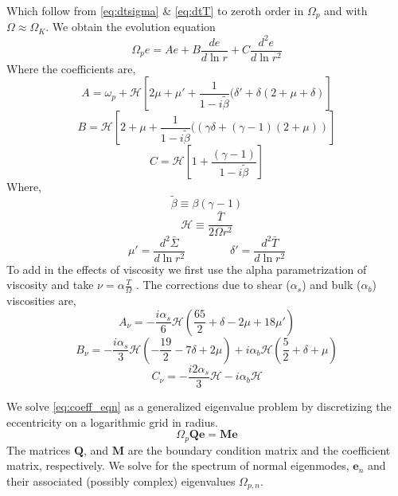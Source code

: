 \documentclass[apj]{emulateapj}
\begin{document}
Which follow from \eqref{eq:dtsigma} \& \eqref{eq:dtT} to zeroth order in $\Omega_p$ and with $\Omega \approx \Omega_K$. We obtain the evolution equation 
\begin{equation} \label{eq:coeff_eqn}
\Omega_p e  = A e + B \frac{d e}{d \ln r} + C  \frac{d^2 e}{ d \ln r^2}
\end{equation}
Where the coefficients are,
\begin{equation}
A = \omega_p  + \mathcal{H} \left[ 2 \mu + \mu'  + \frac{1}{1 - i  \tilde{\beta}} ( \delta' + \delta (2 + \mu + \delta) \right]
\end{equation}
\begin{equation}
B = \mathcal{H} \left[ 2 + \mu + \frac{1}{1 - i \tilde{\beta}} ( \left( \gamma \delta + (\gamma -1 ) (2 + \mu) \right) \right]
\end{equation}
\begin{equation}
C = \mathcal{H} \left[ 1 +  \frac{(\gamma - 1)}{1 - i  \tilde{\beta}} \right]
\end{equation}
Where,
\begin{equation}
\tilde{ \beta} \equiv \beta ( \gamma - 1)
\end{equation}
\begin{equation}
\mathcal{H} \equiv \frac{  \bar{T}}{ 2 \Omega r^2}
\end{equation}
\begin{equation}
\mu ' = \frac{d ^2 \bar{\Sigma}}{d \ln r^2} 
\qquad \qquad
\delta' = \frac{d ^2 \bar{T}}{d \ln r^2}
\end{equation}
To add in the effects of viscosity we first use the alpha parametrization of viscosity and take $\nu = \alpha \frac{T}{\Omega}$ \citep{ss73}. The corrections due to shear ($\alpha_s$) and bulk ($\alpha_b$) viscosities are, 
\begin{equation}
A_\nu = -\frac{i \alpha_s}{6} \mathcal{H} \left( \frac{65}{2} + \delta - 2 \mu + 18 \mu' \right)
\end{equation}
\begin{equation}
B_\nu = -\frac{ i \alpha_s}{3} \mathcal{H} \left( -\frac{19}{2} - 7 \delta + 2 \mu \right) +  i \alpha_b \mathcal{H} \left( \frac{5}{2} + \delta + \mu \right)
\end{equation}
\begin{equation}
C_\nu = - \frac{ i 2\alpha_s}{3} \mathcal{H}  - i \alpha_b \mathcal{H}
\end{equation}



We solve \eqref{eq:coeff_eqn} as a generalized eigenvalue problem by discretizing the eccentricity on a logarithmic grid in radius. 
\begin{equation}
\Omega_p \mathbf{Q} \mathbf{e} = \mathbf{M} \mathbf{e}
\end{equation}
The matrices $\mathbf{Q}$, and $\mathbf{M}$ are the boundary condition matrix and the coefficient matrix, respectively. We solve for the spectrum of normal eigenmodes, $\mathbf{e}_n$ and their associated (possibly complex) eigenvalues $\Omega_{p,n}$. 
\end{document}
